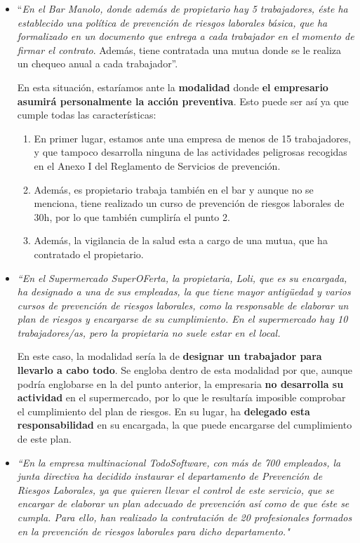 \begin{itemize}
    \item ``\textit{En el Bar Manolo, donde además de propietario hay 5 trabajadores, éste ha establecido una política de prevención de riesgos laborales básica, que ha formalizado en un documento que entrega a cada trabajador en el momento de firmar el contrato}. Además, tiene contratada una mutua donde se le realiza un chequeo anual a cada trabajador''.


    En esta situación, estaríamos ante la \textbf{modalidad} donde \textbf{el empresario asumirá personalmente la acción preventiva}. Esto puede ser así ya que cumple todas las características:

    \begin{enumerate}
        \item En primer lugar, estamos ante una empresa de menos de 15 trabajadores, y que tampoco desarrolla ninguna de las actividades peligrosas recogidas en el Anexo I del Reglamento de Servicios de prevención.
        \item Además, es propietario trabaja también en el bar y aunque no se menciona, tiene realizado un curso de prevención de riesgos laborales de 30h, por lo que también cumpliría el punto 2.
        \item Además, la vigilancia de la salud esta a cargo de una mutua, que ha contratado el propietario.
    \end{enumerate}

    \item \textit{``En el Supermercado SuperOFerta, la propietaria, Loli, que es su encargada, ha designado a una de sus empleadas, la que tiene mayor antigüedad y varios cursos de prevención de riesgos laborales, como la responsable de elaborar un plan de riesgos y encargarse de su cumplimiento. En el supermercado hay 10 trabajadores/as, pero la propietaria no suele estar en el local.}

    En este caso, la modalidad sería la de \textbf{designar un trabajador para llevarlo a cabo todo}. Se engloba dentro de esta modalidad por que, aunque podría englobarse en la del punto anterior, la empresaria \textbf{no desarrolla su actividad} en el supermercado, por lo que le resultaría imposible comprobar el cumplimiento del  plan de riesgos. En su lugar, ha \textbf{delegado esta responsabilidad} en su encargada, la que puede encargarse del cumplimiento de este plan.

    \item \textit{``En la empresa multinacional TodoSoftware, con más de 700 empleados, la junta directiva ha decidido instaurar el departamento de Prevención de Riesgos Laborales, ya que quieren llevar el control de este servicio, que se encargar de elaborar un plan adecuado de prevención así como de que éste se cumpla. Para ello, han realizado la contratación de 20 profesionales formados en la prevención de riesgos laborales para dicho departamento."}


\end{itemize}
